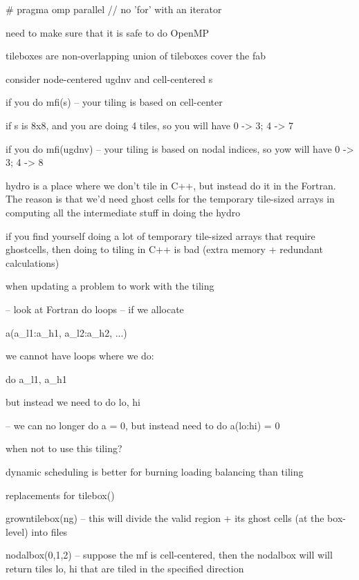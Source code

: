 # pragma omp parallel    // no 'for' with an iterator


need to make sure that it is safe to do OpenMP

tileboxes are non-overlapping
union of tileboxes cover the fab

consider node-centered ugdnv and cell-centered s

if you do mfi(s) -- your tiling is based on cell-center

if s is 8x8, and you are doing 4 tiles, so you will have 0 -> 3; 4 -> 7

if you do mfi(ugdnv) -- your tiling is based on nodal indices, so yow
will have 0 -> 3; 4 -> 8

hydro is a place where we don't tile in C++, but instead do it in the
Fortran.  The reason is that we'd need ghost cells for the temporary
tile-sized arrays in computing all the intermediate stuff in doing
the hydro

if you find yourself doing a lot of temporary tile-sized arrays
that require ghostcells, then doing to tiling in C++ is bad
(extra memory + redundant calculations)



when updating a problem to work with the tiling

-- look at Fortran do loops -- if we allocate

   a(a_l1:a_h1, a_l2:a_h2, ...)

   we cannot have loops where we do:

   do a_l1, a_h1

   but instead we need to do lo, hi

-- we can no longer do a = 0, but instead need to
   do a(lo:hi) = 0



when not to use this tiling?
   
dynamic scheduling is better for burning loading balancing than tiling


replacements for tilebox()

growntilebox(ng) -- this will divide the valid region + its ghost cells (at the box-level)
into files

nodalbox({0,1,2}) -- suppose the mf is cell-centered, then the nodalbox will
                     will return tiles lo, hi that are tiled in the specified
                     direction

                  
 



   





   


